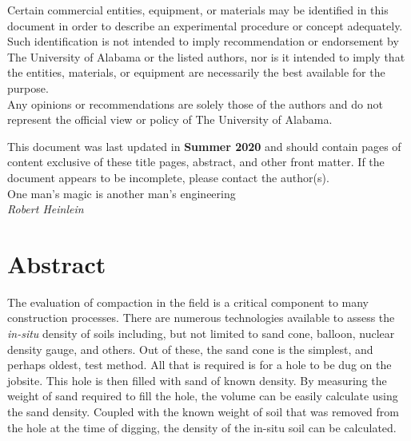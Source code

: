 \documentclass[12pt]{article}
\newcommand{\LastUpdate}{Summer 2020}
\begin{document}
\begin{titlepage}
\begin{center}
\normalsize 
Certain commercial entities, equipment, or materials may be identified in this document in order to describe an experimental procedure or concept adequately. Such identification is not intended to imply recommendation or endorsement by The University of Alabama or the listed authors, nor is it intended to imply that the entities, materials, or equipment are necessarily the best available for the purpose.\\

\vfill
Any opinions or recommendations are solely those of the authors and do not represent the official view or policy of The University of Alabama.
\end{center}
\begin{flushright}
\vfill
\normalsize 
This document was last updated in \textbf{\LastUpdate} and should contain \textbf{\pageref{LastPage}} pages of content exclusive of these title pages, abstract, and other front matter. If the document appears to be incomplete, please contact the author(s).\\
\vfill
One man’s magic is another man’s engineering\\
\textit{Robert Heinlein}
\end{flushright}
\end{titlepage}
\section*{Abstract}
\normalsize The evaluation of compaction in the field is a critical component to many construction processes. There are numerous technologies available to assess the \textit{in-situ} density of soils including, but not limited to sand cone, balloon, nuclear density gauge, and others. Out of these, the sand cone is the simplest, and perhaps oldest, test method. All that is required is for a hole to be dug on the jobsite. This hole is then filled with sand of known density. By measuring the weight of sand required to fill the hole, the volume can be easily calculate using the sand density. Coupled with the known weight of soil that was removed from the hole at the time of digging, the density of the in-situ soil can be calculated.\\
\end{document}
